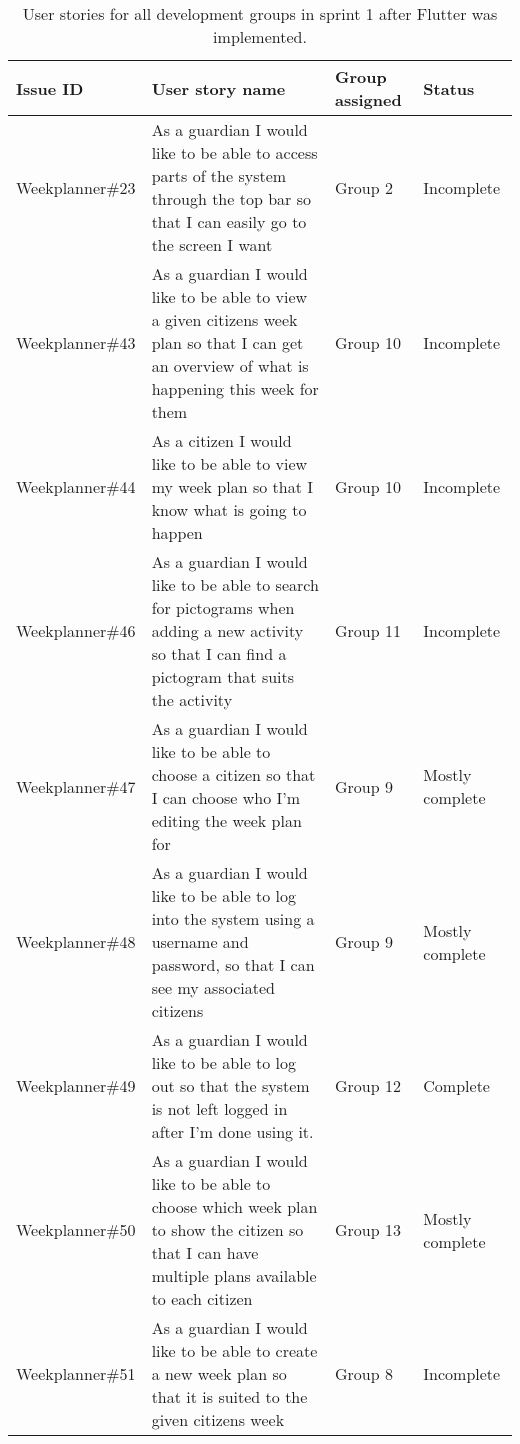 \begin{table}[H]
    \begin{tabular}{|p{2.8cm}|p{7cm}|p{2cm}|p{2cm}|}
    \hline
    Issue ID        & User story name                                                                                                                                                          & Group assigned  & Status     \\ \hline
    Weekplanner\#23 & As a guardian I would like to be able to access parts of the system through the top bar so that I can easily go to the screen I want                                     & Group 2         & Incomplete  \\ \hline
    Weekplanner\#43 & As a guardian I would like to be able to view a given citizens week plan so that I can get an overview of what is happening this week for them                           & Group 10        & Incomplete     \\ \hline
    Weekplanner\#44 & As a citizen I would like to be able to view my week plan so that I know what is going to happen                                                                         & Group 10        & Incomplete       \\ \hline
    Weekplanner\#46 & As a guardian I would like to be able to search for pictograms when adding a new activity so that I can find a pictogram that suits the activity                         & Group 11        & Incomplete      \\ \hline
    Weekplanner\#47 & As a guardian I would like to be able to choose a citizen so that I can choose who I’m editing the week plan for                                                         & Group 9         & Mostly complete    \\ \hline
    Weekplanner\#48 & As a guardian I would like to be able to log into the system using a username and password, so that I can see my associated citizens                                     & Group 9         & Mostly complete    \\ \hline
    Weekplanner\#49 & As a guardian I would like to be able to log out so that the system is not left logged in after I’m done using it.                                                       & Group 12        & Complete     \\ \hline
    Weekplanner\#50 & As a guardian I would like to be able to choose which week plan to show the citizen so that I can have multiple plans available to each citizen                          & Group 13        & Mostly complete     \\ \hline
    Weekplanner\#51 & As a guardian I would like to be able to create a new week plan so that it is suited to the given citizens week                                                          & Group 8         & Incomplete    \\ \hline
   \end{tabular}
   \caption{User stories for all development groups in sprint 1 after Flutter was implemented.}\label{table:user-stories-sprint-1-review}
\end{table}

